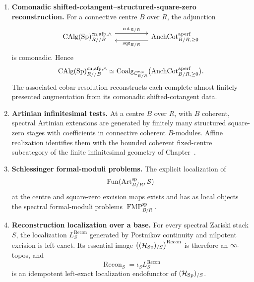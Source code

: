 \begin{theorem}
\begin{enumerate}[label=(\roman*)]
    \item \textbf{Comonadic shifted-cotangent--structured-square-zero reconstruction.}
    For a connective centre \(B\) over \(R\), the adjunction
    \[
    \begin{tikzcd}[column sep=huge]
        \CAlg(\Sp)^{\mathrm{cn},\mathrm{afp},\wedge}_{R//B}
            \arrow[r,shift left=1.2ex,"\operatorname{cot}_{B/R}"]
            &
        \operatorname{AnchCot}^{\mathrm{aperf}}_{B/R,\geq0}
            \arrow[l,shift left=1.2ex,"\operatorname{sqz}_{B/R}"]
    \end{tikzcd}
    \]
    is comonadic. Hence
    \[
        \operatorname{CAlg}(\operatorname{Sp})^{\mathrm{cn},\mathrm{afp},\wedge}_{R//B}
        \simeq
        \operatorname{Coalg}_{\mathbb C^{\mathrm{sqz}}_{B/R}}
        \bigl(\operatorname{AnchCot}^{\mathrm{aperf}}_{B/R,\geq0}\bigr).
    \]
    The associated cobar resolution reconstructs each complete
    almost finitely presented augmentation from its comonadic shifted-cotangent data.

    \item \textbf{Artinian infinitesimal tests.}
    At a centre \(B\) over \(R\), with \(B\) coherent, spectral Artinian extensions are generated
    by finitely many structured square-zero stages with coefficients in connective coherent \(B\)-modules. Affine realization identifies them with the
    bounded coherent fixed-centre subcategory of the finite infinitesimal
    geometry of Chapter~.

    \item \textbf{Schlessinger formal-moduli problems.}
    The explicit localization of
    \[
        \operatorname{Fun}(\operatorname{Art}^{\mathrm{sp}}_{B/R},\mathcal S)
    \]
    at the centre and square-zero excision maps exists and has as local
    objects the spectral formal-moduli problems
    \(\operatorname{FMP}^{\mathrm{sp}}_{B/R}\).

    \item \textbf{Reconstruction localization over a base.}
    For every spectral Zariski stack \(S\), the localization
    \(L^{\mathrm{Recon}}_S\) generated by Postnikov continuity and nilpotent
    excision is left exact. Its essential image
    \(\bigl((\mathcal H_{\operatorname{Sp}})_{/S}\bigr)^{\mathrm{Recon}}\) is therefore an \(\infty\)-topos, and
    \[
        \operatorname{Recon}_S
        =
        \iota_S L^{\mathrm{Recon}}_S
    \]
    is an idempotent left-exact localization endofunctor of
    \((\mathcal H_{\operatorname{Sp}})_{/S}\).


\end{enumerate}
\end{theorem}
